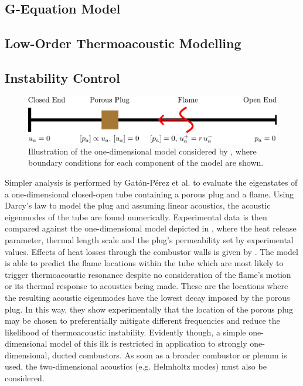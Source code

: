 \subsection{G-Equation Model}





\subsection{Low-Order Thermoacoustic Modelling}


\cite{juniper2018SensitivityNonlinearityThermoacoustic}




\subsection{Instability Control}

\begin{figure}[t]
\centering
\includegraphics[scale=0.6]{assets/imgs/GP-model.pdf}
\caption{Illustration of the one-dimensional model considered by \cite{gaton-perez2025MitigationThermoacousticInstabilities}, where boundary conditions for each component of the model are shown.}
\label{fig:GP-model}
\end{figure}

Simpler analysis is performed by Gatón-Pérez et al. \cite{gaton-perez2025MitigationThermoacousticInstabilities} to evaluate the eigenstates of a one-dimensional closed-open tube containing a porous plug and a flame. Using Darcy's law to model the plug and assuming linear acoustics, the acoustic eigenmodes of the tube are found numerically. Experimental data is then compared against the one-dimensional model depicted in , where the heat release parameter, thermal length scale and the plug's permeability set by experimental values. Effects of heat losses through the combustor walls is given by \cite{flores-montoya2022NonadiabaticModulationPremixedflame}. The model is able to predict the flame locations within the tube which are most likely to trigger thermoacoustic resonance despite no consideration of the flame's motion or its thermal response to acoustics being made. These are the locations where the resulting acoustic eigenmodes have the lowest decay imposed by the porous plug. In this way, they show experimentally that the location of the porous plug may be chosen to preferentially mitigate different frequencies and reduce the likelihood of thermoacoustic instability. Evidently though, a simple one-dimensional model of this ilk is restricted in application to strongly one-dimensional, ducted combustors. As soon as a broader combustor or plenum is used, the two-dimensional acoustics (e.g. Helmholtz modes) must also be considered.

